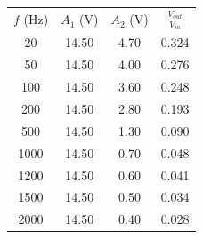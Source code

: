 \begin{center}
\begin{tabular}{cccc}
$f$ (\unit{\hertz}) & $A_1$ (\unit{\volt}) & $A_2$ (\unit{\volt}) & $\frac{V_{out}}{V_{in}}$ \\ 
\num{20} & \num{14.50} & \num{4.70} & \num{0.324}\\ 
\num{50} & \num{14.50} & \num{4.00} & \num{0.276}\\ 
\num{100} & \num{14.50} & \num{3.60} & \num{0.248}\\ 
\num{200} & \num{14.50} & \num{2.80} & \num{0.193}\\ 
\num{500} & \num{14.50} & \num{1.30} & \num{0.090}\\ 
\num{1000} & \num{14.50} & \num{0.70} & \num{0.048}\\ 
\num{1200} & \num{14.50} & \num{0.60} & \num{0.041}\\ 
\num{1500} & \num{14.50} & \num{0.50} & \num{0.034}\\ 
\num{2000} & \num{14.50} & \num{0.40} & \num{0.028}\\ 
\end{tabular}
\end{center}
